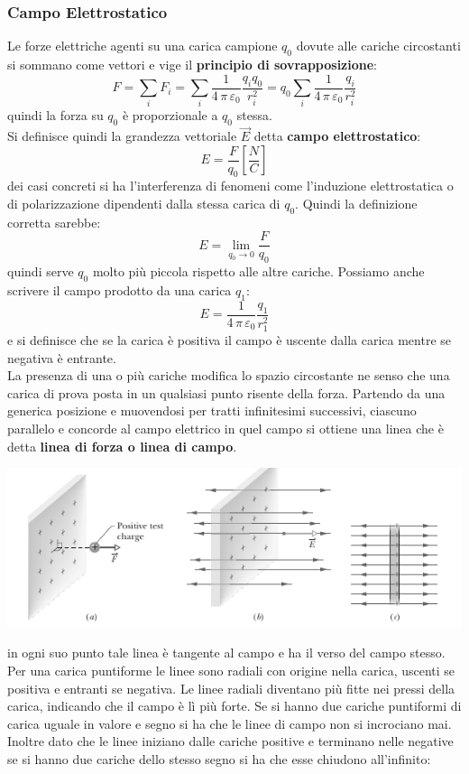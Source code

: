\documentclass[a4paper,12pt, oneside]{book}
\begin{document}
\subsubsection{Campo Elettrostatico}
Le forze elettriche agenti su una carica campione $q_0$ dovute alle cariche circostanti si sommano come vettori e vige il \textbf{principio di sovrapposizione}:
$$F=\sum_i F_i=\sum_i \frac{1}{4\,\pi\,\varepsilon_0}\frac{q_iq_0}{r_i^2}=q_0\sum_i\frac{1}{4\,\pi\,\varepsilon_0}\frac{q_i}{r_i^2}$$
quindi la forza su $q_0$ è proporzionale a $q_0$ stessa.\\
Si definisce quindi la grandezza vettoriale $\vec{E}$ detta \textbf{campo elettrostatico}:
$$E=\frac{F}{q_0}\left[\frac{N}{C}\right]$$
dei casi concreti si ha l'interferenza di fenomeni come l'induzione elettrostatica o di polarizzazione dipendenti dalla stessa carica di $q_0$. Quindi la definizione corretta sarebbe:
$$E=\lim_{q_0\to 0}\frac{F}{q_0}$$
quindi serve $q_0$ molto più piccola rispetto alle altre cariche. Possiamo anche scrivere il campo prodotto da una carica $q_1$:
$$E=\frac{1}{4\,\pi\,\varepsilon_0}\frac{q_1}{r_1^2}$$
e si definisce che se la carica è positiva il campo è uscente dalla carica mentre se negativa è entrante.\\
La presenza di una o più cariche modifica lo spazio circostante ne senso che una carica di prova posta in un qualsiasi punto risente della forza. Partendo da una generica posizione e muovendosi per tratti infinitesimi successivi, ciascuno parallelo e concorde al campo elettrico in quel campo si ottiene una linea che è detta \textbf{linea di forza o linea di campo}.
\begin{center}
	\includegraphics[scale=0.7]{img/ele.png}
\end{center}
in ogni suo punto tale linea è tangente al campo e ha il verso del campo stesso. Per una carica puntiforme le linee sono radiali con origine nella carica, uscenti se positiva e entranti se negativa. Le linee radiali diventano più fitte nei pressi della carica, indicando che il campo è lì più forte. Se si hanno due cariche puntiformi di carica uguale in valore e segno si ha che le linee di campo non si incrociano mai. Inoltre dato che le linee iniziano dalle cariche positive e terminano nelle negative se si hanno due cariche dello stesso segno si ha che esse chiudono all'infinito:
\end{document}
